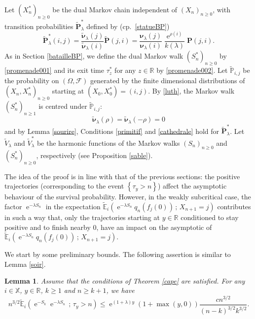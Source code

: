 \documentclass[12pt]{amsart}
\newtheorem{lemma}[theorem]{Lemma}
\theoremstyle{definition}
\numberwithin{equation}{section}
\def\bb#1{\mathbb{#1}}
\def\bs#1{\boldsymbol{#1}}
\def\bf#1{\mathbf{#1}}
\def\scr#1{\mathscr{#1}}
\def\tt#1{\tilde{#1}}
\def\tbf#1{\tilde{\mathbf{#1}}}
\def\tbs#1{\tilde{\boldsymbol{#1}}}
\def\tbb#1{\tilde{\mathbb{#1}}}
\def\geq{\geqslant}
\def\leq{\leqslant}
\renewcommand\ll{\lambda}
\DeclareMathOperator{\e}{e}
\begin{document}
Let $\left( X_n^* \right)_{n\geq 0}$ be the dual Markov chain  independent of $\left( X_n \right)_{n\geq 0}$, 
with transition probabilities $\tbf P_{\ll}^*$ defined by (cp.\ \eqref{statueBP})
\begin{equation}
\label{monument}
\tbf P_{\ll}^*(i,j) = \frac{\tbs \nu_{\ll}(j)}{\tbs \nu_{\ll}(i)} \tbf P(j,i) = \frac{\bs \nu_{\ll}(j)}{\bs \nu_{\ll}(i)} \frac{\e^{\rho(i)}}{k(\ll)} \bf P(j,i).
\end{equation}
As in Section \ref{batailleBP}, we define the dual Markov walk $( S_n^* )_{n\geq 0}$  by \eqref{promenade001} and its exit time $\tau_z^*$ for any $z \in \bb R$ by \eqref{promenade002}. Let $\tbb P_{i,j}$ be the probability on $\left( \Omega, \scr F \right)$ generated by the finite dimensional distributions of $( X_n, X_n^* )_{n\geq 0}$ starting at $(X_0,X_0^*) = (i,j)$. By \eqref{luth}, the Markov walk $( S_n^* )_{n\geq 1}$ is centred under $\tbb P_{i,j}$:
\[
\tbs \nu_{\ll} (\rho) = \tbs \nu_{\ll} (-\rho) = 0
\]
and by Lemma \ref{sourire}, Conditions \ref{primitif} and \ref{cathedrale} hold for $\tbf P_{\ll}^*$. 
Let $\tt V_{\ll}$ and $\tt V_{\ll}^*$ be the harmonic functions of the Markov walks $\left( S_n \right)_{n\geq 0}$ 
and $\left( S_n^* \right)_{n\geq 0}$, respectively
(see Proposition \ref{sable}).

The idea of the proof is in line with that of the previous sections: the positive trajectories 
(corresponding to the event $\left\{ \tau_y > n \right\}$) affect the asymptotic behaviour of the survival probability. However, in the weakly subcritical case, the factor $\e^{-\ll S_n}$ 
in the expectation $\tbb E_i ( \e^{-\ll S_n} q_n\left( f_j(0) \right) \,;\, X_{n+1} = j )$
contributes in such a way that, only the trajectories starting at $y\in \bb R$ conditioned to 
stay positive and to finish nearby $0$, have an impact on the asymptotic 
of $\tbb E_i \left( \e^{-\ll S_n} q_n\left( f_j(0) \right) \,;\, X_{n+1} = j \right)$. 

We start by some preliminary bounds.
The following assertion is similar to Lemma \ref{soir}.

\begin{lemma} Assume that the conditions of Theorem \ref{cape} are satisfied.
\label{savaneBP}
For any $i \in \bb X$, $y \in \bb R$, $k \geq 1$ and $n\geq k+1$, we have
\[
n^{3/2} \tbb E_i \left( \e^{-S_k} \e^{-\ll S_n} \,;\, \tau_y > n \right) \leq \e^{(1+\ll) y} (1+\max(y,0)) \frac{c n^{3/2}}{(n-k)^{3/2}k^{3/2}}.
\]
\end{lemma}
\end{document}
